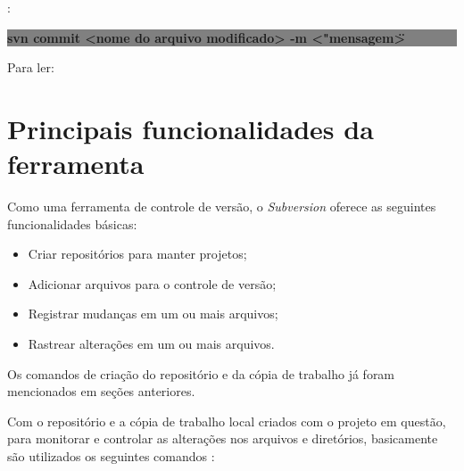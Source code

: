 \begin{multicols}{2}


:{

\colorbox{Gray}{
\begin{minipage}{210px}
  \textbf{svn commit <nome do arquivo modificado> -m <"mensagem\">}
\end{minipage}
}
}

Para ler:

\colorbox{Gray}{
\begin{minipage}{100px}
\end{minipage}
}

\end{multicols}

\section{Principais funcionalidades da ferramenta}

Como uma ferramenta de controle de versão, o \textit{Subversion} oferece as seguintes funcionalidades básicas:

\begin{itemize}
 \item Criar repositórios para manter projetos;
 \item Adicionar arquivos para o controle de versão; 
 \item Registrar mudanças em um ou mais arquivos;
 \item Rastrear alterações em um ou mais arquivos.
\end{itemize}

Os comandos de criação do repositório e da cópia de trabalho já foram mencionados em seções anteriores.

Com o repositório e a cópia de trabalho local criados com o projeto em questão, para monitorar e controlar as
alterações nos arquivos e diretórios, basicamente são utilizados os seguintes comandos \cite{svn-book}:

